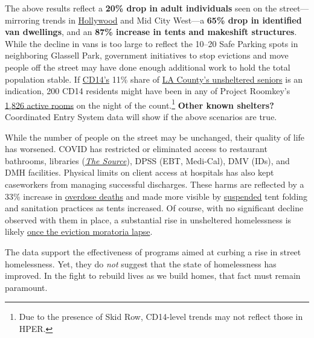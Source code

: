 \documentclass[11pt]{article}
\def\bfr{\bf\color{red}}
\begin{document}
 The above results reflect a {\bf 20\% drop in adult individuals} 
 seen on the street---mirroring trends in 
\href{https://www.latimes.com/homeless-housing/story/2021-04-13/despite-appearances-15-fewer-homeless-people-were-on-hollywood-streets-this-year}{Hollywood} and Mid City West---a {\bf 65\% 
drop in identified van dwellings}, and an {\bf 87\% increase in tents and makeshift structures}. 
While the decline in vans is too large to reflect the 10--20 Safe Parking spots in neighboring
Glassell Park, government initiatives to stop evictions and move people off the street may have 
done enough additional work to hold the total population stable. 
If \href{https://www.lahsa.org/documents?id=4673-2020-homeless-count-council-district-14}{CD14's} 11\% share of \href{https://www.lahsa.org/documents?id=4585-2020-greater-los-angeles-homeless-count-los-angeles-continuum-of-care-coc-}{LA County's unsheltered seniors} 
is an indication, 200 CD14 residents might have been in any of Project Roomkey's 
\href{https://projectroomkeytracker.com/}{1,826 active rooms} on the night of the 
count.\footnote{Due to the presence of Skid Row, CD14-level trends may not
reflect those in HPER.} {\bfr Other known shelters?} Coordinated Entry System data will show 
if the above scenarios are true.

While the number of people on the street may be unchanged, their quality of life has worsened. 
COVID has restricted or eliminated access to restaurant bathrooms, libraries 
(\href{https://www.lapl.org/homeless-resources/the-source}{\it The Source}), DPSS 
(EBT, Medi-Cal), DMV (IDs), and DMH facilities. Physical limits on client access at 
hospitals has also kept caseworkers from managing successful discharges. These harms 
are reflected by a 33\% increase in 
\href{http://publichealth.lacounty.gov/chie/reports/HomelessMortality2020_CHIEBrief_Final.pdf}{overdose deaths} and made more visible by \href{https://clkrep.lacity.org/onlinedocs/2020/20-0147_misc_3-17-20_p.pdf}{suspended}
tent folding and sanitation practices as tents increased.
Of course, with no significant decline observed with them in place, a substantial rise in unsheltered 
homelessness is likely \href{https://www.latimes.com/california/story/2021-01-12/new-report-foresees-tens-of-thousands-losing-homes-by-2023}
{once the eviction moratoria lapse}.

The data support the effectiveness of programs aimed at curbing a rise in street homelessness.
Yet, they do {\it not} suggest that the state of homelessness has improved. In the fight to rebuild 
lives as we build homes, that fact must remain paramount.

\end{document}
